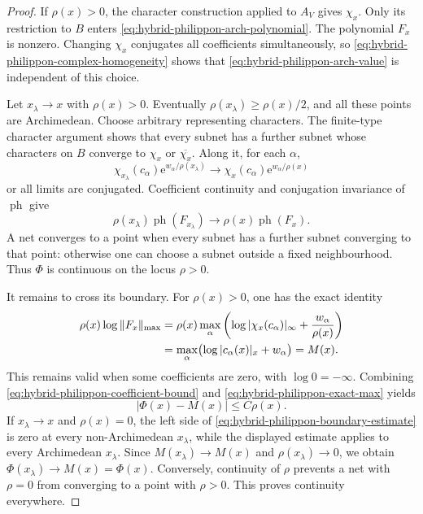 \begin{proof}
If \(\rho(x)>0\), the character construction applied to \(A_V\) gives
\(\chi_x\).  Only its restriction to \(B\) enters
\eqref{eq:hybrid-philippon-arch-polynomial}.  The polynomial \(F_x\) is
nonzero.  Changing \(\chi_x\) conjugates all coefficients simultaneously,
so \eqref{eq:hybrid-philippon-complex-homogeneity} shows that
\eqref{eq:hybrid-philippon-arch-value} is independent of this choice.

Let \(x_\lambda\to x\) with \(\rho(x)>0\).  Eventually
\(\rho(x_\lambda)\geq\rho(x)/2\), and all these points are Archimedean.
Choose arbitrary representing characters.  The finite-type character
argument shows that every subnet has a further subnet whose characters on
\(B\) converge to \(\chi_x\) or \(\overline{\chi_x}\).  Along it, for each
\(\alpha\),
\[
 \chi_{x_\lambda}(c_\alpha)
 \mathrm e^{w_\alpha/\rho(x_\lambda)}
 \longrightarrow
 \chi_x(c_\alpha)\mathrm e^{w_\alpha/\rho(x)}
\]
or all limits are conjugated.  Coefficient continuity and conjugation
invariance of \(\operatorname{ph}\) give
\[
 \rho(x_\lambda)\operatorname{ph}(F_{x_\lambda})
 \longrightarrow\rho(x)\operatorname{ph}(F_x).
\]
A net converges to a point when every subnet has a further subnet converging
to that point: otherwise one can choose a subnet outside a fixed
neighbourhood.  Thus \(\Phi\) is continuous on the locus \(\rho>0\).

It remains to cross its boundary.  For \(\rho(x)>0\), one has the exact
identity
\begin{align}
 \rho(x)\log\|F_x\|_{\max}
 &=\rho(x)\max_\alpha
 \left(\log|\chi_x(c_\alpha)|_\infty+
 \frac{w_\alpha}{\rho(x)}\right)\notag\\
 &=\max_\alpha\bigl(\log|c_\alpha(x)|_x+w_\alpha\bigr)
 =M(x).
 \label{eq:hybrid-philippon-exact-max}
\end{align}
This remains valid when some coefficients are zero, with
\(\log0=-\infty\).  Combining
\eqref{eq:hybrid-philippon-coefficient-bound} and
\eqref{eq:hybrid-philippon-exact-max} yields
\begin{equation}\label{eq:hybrid-philippon-boundary-estimate}
 |\Phi(x)-M(x)|\leq C\rho(x).
\end{equation}
If \(x_\lambda\to x\) and \(\rho(x)=0\), the left side of
\eqref{eq:hybrid-philippon-boundary-estimate} is zero at every
non-Archimedean \(x_\lambda\), while the displayed estimate applies to
every Archimedean \(x_\lambda\).  Since \(M(x_\lambda)\to M(x)\) and
\(\rho(x_\lambda)\to0\), we obtain
\(\Phi(x_\lambda)\to M(x)=\Phi(x)\).  Conversely, continuity of \(\rho\)
prevents a net with \(\rho=0\) from converging to a point with \(\rho>0\).
This proves continuity everywhere.


\end{proof}
